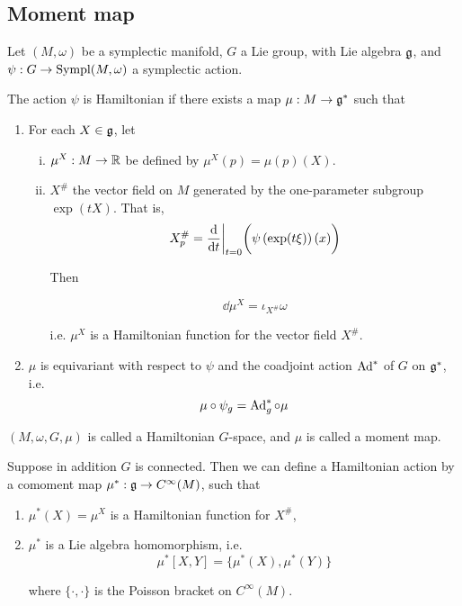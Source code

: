 \subsection{Moment map}

Let \((M, \omega)\) be a symplectic manifold, \(G\) a Lie group, with Lie algebra \(\mathfrak{g}\), and \(\psi : G \to \operatorname{Sympl}(M, \omega)\) a symplectic action.

\begin{definition}
     The action \(\psi\) is Hamiltonian if there exists a map \(\mu : M \to \mathfrak{g}^*\) such that

    \begin{enumerate}
        \item For each \(X \in \mathfrak{g}\), let
        {\begin{enumerate}[(i)]
            \item \(\mu^X : M \to \mathbb{R}\) be defined by \(\mu^X(p) = \mu(p)(X)\).
            \item \(X^\#\) the vector field on \(M\) generated by the one-parameter subgroup \(\exp(tX)\). That is,
            \[X^\#_p = \dv{t}\bigg\vert_{t =0}\bigg(\psi\left(\exp(t\xi)\right)(x)\bigg)\]

            Then

            \[\dd\mu^X = \iota_{X^\#}\omega\]

            i.e. \(\mu^X\) is a Hamiltonian function for the vector field \(X^\#\).
        \end{enumerate}}
        \item \(\mu\) is equivariant with respect to \(\psi\) and the coadjoint action \(\operatorname{Ad}^*\) of \(G\) on \(\mathfrak{g}^*\), i.e.
        \[\mu \circ \psi_g = \operatorname{Ad}^*_g \circ \mu\]
    \end{enumerate}

    \((M, \omega, G, \mu)\) is called a Hamiltonian \(G\)-space, and \(\mu\) is called a moment map.
\end{definition}

\begin{definition}

    Suppose in addition \(G\) is connected. Then we can define a Hamiltonian action by a comoment map \(\mu^* : \mathfrak{g} \to C^\infty(M)\), such that

    \begin{enumerate}
        \item \(\mu^*(X) = \mu^X\) is a Hamiltonian function for \(X^\#\),
        \item \(\mu^*\) is a Lie algebra homomorphism, i.e.
        \[\mu^*[X, Y] = \{\mu^*(X), \mu^*(Y)\}\]

        where \(\{\cdot, \cdot\}\) is the Poisson bracket on \(C^\infty(M)\).
    \end{enumerate}
\end{definition}

